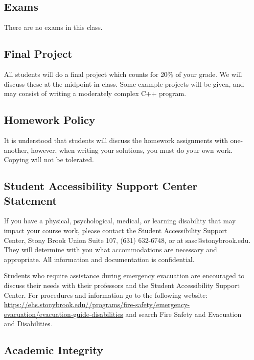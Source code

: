 \documentclass[10pt]{article}
\begin{document}
\subsection*{Exams}

\noindent There are no exams in this class.

\subsection*{Final Project}

\noindent All students will do a final project which counts for 20\%
of your grade.  We will discuss these at the midpoint in class.  Some
example projects will be given, and may consist of writing a moderately
complex C++ program.

\subsection*{Homework Policy}

\noindent It is understood that students will discuss the homework
assignments with one-another, however, when writing your solutions,
you must do your own work.  Copying will not be tolerated.



\subsection*{Student Accessibility Support Center Statement}

If you have a physical, psychological, medical, or learning disability
that may impact your course work, please contact the Student
Accessibility Support Center, Stony Brook Union Suite 107, (631)
632-6748, or at sasc@stonybrook.edu. They will determine with you what
accommodations are necessary and appropriate. All information and
documentation is confidential.

Students who require assistance during emergency evacuation are
encouraged to discuss their needs with their professors and the
Student Accessibility Support Center. For procedures and information
go to the following website:
{\small \url{https://ehs.stonybrook.edu//programs/fire-safety/emergency-evacuation/evacuation-guide-disabilities}}
and search Fire Safety and Evacuation and Disabilities.

\subsection*{Academic Integrity}
\end{document}
